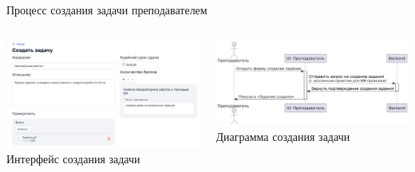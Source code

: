 \documentclass[aspectratio=169]{beamer}
\begin{document}
%

\begin{frame}{Процесс создания задачи преподавателем}
\vspace{0.5em}

\begin{columns}
    \begin{column}{0.5\textwidth}
        \centering
        \includegraphics[width=\linewidth]{static/TaskCreate.png} \\
        \small Интерфейс создания задачи
    \end{column}
    \begin{column}{0.5\textwidth}
        \centering
        \includegraphics[width=\linewidth]{static/TaskCreateDiagram.png} \\
        \small Диаграмма создания задачи
    \end{column}
\end{columns}
\end{frame}
\end{document}
